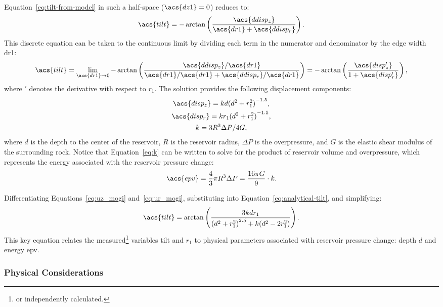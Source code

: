 Equation~\eqref{eq:tilt-from-model} in such a half-space ($\acs{dz1} = 0$) reduces to:
\begin{equation}
    \acs{tilt} = 
    -\arctan\left(\dfrac{\acs{ddisp_z}}{\acs{dr1}+\acs{ddisp_r}}\right).\label{eq:tilt-from-flat-model}
\end{equation}
This discrete equation can be taken to the continuous limit by dividing each term in the numerator and denominator by the edge width \acs{dr1}:
\begin{equation}
\acs{tilt}
    = \lim_{\acs{dr1}\to0} 
    -\arctan\left(\dfrac{\acs{ddisp_z}/\acs{dr1}}{\acs{dr1}/\acs{dr1}
    + \acs{ddisp_r}/\acs{dr1}}\right) = 
    -\arctan\left(\dfrac{\acs{disp_z'}}{1+\acs{disp_r'}}\right),\label{eq:analytical-tilt}
\end{equation}
where $'$ denotes the derivative with respect to $r_1$. The \textcite{mogi_relations_1958} solution provides the following displacement components:
\begin{gather}
    \acs{disp_z} = kd{(d^2+r_1^2)}^{-1.5},\label{eq:uz_mogi}\\
    \acs{disp_r} = kr_1{(d^2+r_1^2)}^{-1.5},\label{eq:ur_mogi}\\
    k = {3R^3\Delta P}/{4G},\label{eq:k}
\end{gather}
where $d$ is the depth to the center of the reservoir, $R$ is the reservoir radius, $\Delta P$ is the overpressure, and $G$ is the elastic shear modulus of the surrounding rock. Notice that Equation~\eqref{eq:k} can be written to solve for the product of reservoir volume and overpressure, which represents the energy associated with the reservoir pressure change:
\begin{equation}
    \acs{epv} = \frac{4}{3}\pi R^3\Delta P=\frac{16\pi G}{9} \cdot k.\label{eq:epv}
\end{equation}

Differentiating Equations~\eqref{eq:uz_mogi} and~\eqref{eq:ur_mogi}, substituting into Equation~\eqref{eq:analytical-tilt}, and simplifying:
\begin{equation}
    \acs{tilt} = \arctan\left(\frac{3kdr_1}{{(d^2+r_1^2)}^{2.5}+k(d^2-2r_1^2)}\right).\label{eq:mogi-tilt}
\end{equation}
This key equation relates the measured\footnote{or independently calculated.} variables \acs{tilt} and $r_1$ to physical parameters associated with reservoir pressure change: depth $d$ and energy \acs{epv}.

\subsubsection{Physical Considerations}


